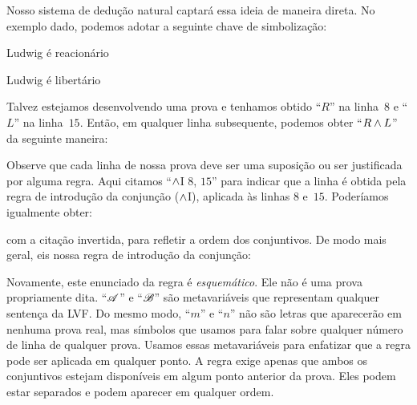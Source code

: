 Nosso sistema de dedução natural captará essa ideia de maneira direta. No exemplo dado, podemos adotar a seguinte chave de simbolização:
	\begin{ekey}
		\item[R] Ludwig é reacionário
		\item[L] Ludwig é libertário
	\end{ekey}
Talvez estejamos desenvolvendo uma prova e tenhamos obtido \textquotedblleft$R$\textquotedblright{} na
linha~$8$ e \textquotedblleft$L$\textquotedblright{} na linha~$15$. Então, em qualquer linha subsequente, podemos
obter \textquotedblleft$R \wedge L$\textquotedblright{} da seguinte maneira:
\begin{fitchproof}
	 
\end{fitchproof}
Observe que cada linha de nossa prova deve ser uma suposição ou
ser justificada por alguma regra. Aqui citamos \textquotedblleft$\wedge$I $8$, $15$\textquotedblright{} para
indicar que a linha é obtida pela regra de introdução da conjunção
($\wedge$I), aplicada às linhas $8$ e~$15$. Poderíamos igualmente obter:
\begin{fitchproof}
	 
\end{fitchproof}
com a citação invertida, para refletir a ordem dos conjuntivos. De modo mais geral, eis nossa regra de introdução da conjunção:

Novamente, este enunciado da regra é \emph{esquemático}. Ele não é
uma prova propriamente dita. \textquotedblleft$\mathscr{A}$\textquotedblright{} e \textquotedblleft$\mathscr{B}$\textquotedblright{} são metavariáveis
que representam qualquer sentença da LVF. Do mesmo modo, \textquotedblleft$m$\textquotedblright{} e \textquotedblleft$n$\textquotedblright{} não são
letras que aparecerão em nenhuma prova real, mas símbolos que usamos
para falar sobre qualquer número de linha de qualquer prova. Usamos essas metavariáveis para
enfatizar que a regra pode ser aplicada em qualquer ponto. A regra exige
apenas que ambos os conjuntivos estejam disponíveis em algum ponto anterior da
prova. Eles podem estar separados e podem aparecer em qualquer ordem.

